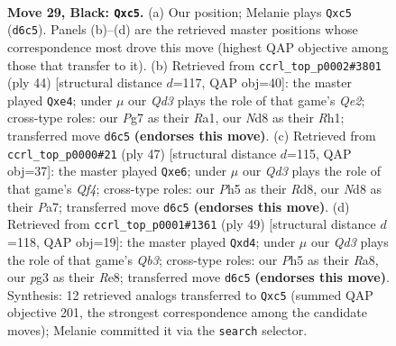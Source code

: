 \documentclass[11pt]{article}
\begin{document}
\clearpage

\begin{figure}[p]\centering
\begin{subfigure}{0.46\textwidth}\centering
\resizebox{\linewidth}{!}{%
\newchessgame
\chessboard[
  setfen={r2n1k2/1p1b1pp1/p2q4/2B3np/Q6N/4P1P1/PP2RPBP/1R4K1 b - - 0 29},
  showmover=false,
  pgfstyle=straightmove, color=movearrow, markmove={d6-c5}
]}
\caption{}
\end{subfigure}\hfill
\begin{subfigure}{0.46\textwidth}\centering
\resizebox{\linewidth}{!}{%
\newchessgame
\chessboard[
  setfen={1rb2rk1/6pp/p2p3b/3Npp2/1P2q2P/2P5/4QPP1/R3KB1R w KQ - 0 23},
  showmover=false,
  pgfstyle=straightmove, color=movearrow, markmove={e2-e4}
]}
\caption{}
\end{subfigure}
\\[4pt]
\begin{subfigure}{0.46\textwidth}\centering
\resizebox{\linewidth}{!}{%
\newchessgame
\chessboard[
  setfen={1r1r2k1/pp3pp1/4B1np/4pq2/4N3/1P2P1Q1/P4PPP/R1R3K1 b - - 0 24},
  showmover=false,
  pgfstyle=straightmove, color=movearrow, markmove={f5-e6}
]}
\caption{}
\end{subfigure}\hfill
\begin{subfigure}{0.46\textwidth}\centering
\resizebox{\linewidth}{!}{%
\newchessgame
\chessboard[
  setfen={r3r1k1/1p3pp1/pq5p/8/P2B2Q1/1PN3R1/1Pn2PPP/R5K1 b - - 0 25},
  showmover=false,
  pgfstyle=straightmove, color=movearrow, markmove={b6-d4}
]}
\caption{}
\end{subfigure}
\caption{\textbf{Move 29, Black: \texttt{Qxc5}.} (a) Our position; Melanie plays \texttt{Qxc5} (\texttt{d6c5}). Panels (b)--(d) are the retrieved master positions whose correspondence most drove this move (highest QAP objective among those that transfer to it). (b) Retrieved from \texttt{ccrl\_top\_p0002\#3801} (ply 44) [structural distance $d$=117, QAP obj=40]: the master played \texttt{Qxe4}; under $\mu$ our \emph{Qd3} plays the role of that game's \emph{Qe2}; cross-type roles: our \emph{P}g7 as their \emph{R}a1, our \emph{N}d8 as their \emph{R}h1; transferred move \texttt{d6c5} \textbf{(endorses this move)}. (c) Retrieved from \texttt{ccrl\_top\_p0000\#21} (ply 47) [structural distance $d$=115, QAP obj=37]: the master played \texttt{Qxe6}; under $\mu$ our \emph{Qd3} plays the role of that game's \emph{Qf4}; cross-type roles: our \emph{P}h5 as their \emph{R}d8, our \emph{N}d8 as their \emph{P}a7; transferred move \texttt{d6c5} \textbf{(endorses this move)}. (d) Retrieved from \texttt{ccrl\_top\_p0001\#1361} (ply 49) [structural distance $d$=118, QAP obj=19]: the master played \texttt{Qxd4}; under $\mu$ our \emph{Qd3} plays the role of that game's \emph{Qb3}; cross-type roles: our \emph{P}h5 as their \emph{R}a8, our \emph{p}g3 as their \emph{R}e8; transferred move \texttt{d6c5} \textbf{(endorses this move)}. Synthesis: 12 retrieved analogs transferred to \texttt{Qxc5} (summed QAP objective 201, the strongest correspondence among the candidate moves); Melanie committed it via the \texttt{search} selector.}
\label{fig:thought-m57}
\end{figure}
\end{document}
